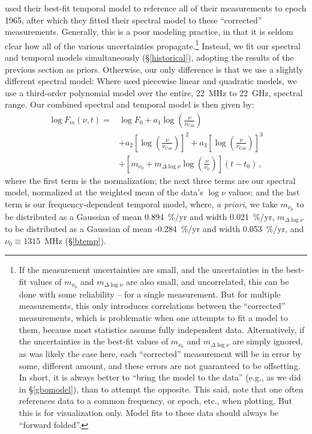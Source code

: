 \documentclass[fleqn,usenatbib]{mnras}
\begin{document}
\citet{b77} used their best-fit temporal model to reference all of their measurements to epoch 1965, after which they fitted their spectral model to these ``corrected'' measurements.  Generally, this is a poor modeling practice, in that it is seldom clear how all of the various uncertainties propagate.\footnote{If the measurement uncertainties are small, and the uncertainties in the best-fit values of $m_{\nu_0}$ and $m_{\Delta\log\nu}$ are also small, and uncorrelated, this can be done with some reliability -- for a single measurement.  But for multiple measurements, this only introduces correlations between the ``corrected'' measurements, which is problematic when one attempts to fit a model to them, because most statistics assume fully independent data.  Alternatively, if the uncertainties in the best-fit values of $m_{\nu_0}$ and $m_{\Delta\log\nu}$ are simply ignored, as was likely the case here, each ``corrected'' measurement will be in error by some, different amount, and these errors are not guaranteed to be offsetting.  In short, it is always better to ``bring the model to the data'' (e.g., as we did in \S\ref{gbomodel}), than to attempt the opposite.  This said, note that one often references data to a common frequency, or epoch, etc., when plotting.  But this is for visualization only.  Model fits to these data should always be ``forward folded''.}  Instead, we fit our spectral and temporal models simultaneously (\S\ref{historical}), adopting the results of the previous section as priors.  Otherwise, our only difference is that we use a slightly different spectral model:  Where \citet{b77} used piecewise linear and quadratic models, we use a third-order polynomial model over the entire, 22~MHz to 22~GHz, spectral range.  Our combined spectral and temporal model is then given by:
\begin{equation}\label{model}
\begin{split}
\log F_m(\nu,t) = &\log F_0 + a_1\log\left(\frac{\nu}{\nu_\mathrm{Cas}}\right) \\
& + a_2\left[\log\left(\frac{\nu}{\nu_\mathrm{Cas}}\right)\right]^2  
+ a_3\left[\log\left(\frac{\nu}{\nu_\mathrm{Cas}}\right)\right]^3 \\
& + \left[m_{\nu_0}+m_{\Delta\log\nu}\log\left(\frac{\nu}{\nu_0}\right)\right](t-t_0) \, ,
\end{split}  
\end{equation}
\noindent
where the first term is the normalization; the next three terms are our spectral model, normalized at the weighted mean of the data's $\log\nu$ values; and the last term is our frequency-dependent temporal model, where, \textit{a priori}, we take $m_{\nu_0}$ to be distributed as a Gaussian of mean 0.894~\%/yr and width 0.021~\%/yr, $m_{\Delta\log\nu}$ to be distributed as a Gaussian of mean -0.284~\%/yr and width 0.053~\%/yr, and $\nu_0 \equiv 1315$~MHz (\S\ref{btemp}). 
\end{document}
